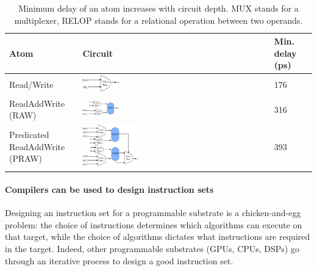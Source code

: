 \begin{table}[!t]
  \begin{scriptsize}
    \begin{tabular}{|p{}|p{}|p{}|}
  \hline
  Atom & Circuit & Min. delay (ps) \\
  \hline
  Read/Write & \includegraphics[width=0.2\textwidth]{rw.pdf} & 176 \\
  \hline
  ReadAddWrite (RAW) & \includegraphics[width=0.2\textwidth]{raw.pdf} & 316\\
  \hline
  \pbox{0.1\textwidth}
  {Predicated\\
  ReadAddWrite (PRAW)} & \includegraphics[width=0.3\textwidth]{pred_raw.pdf}  & 393 \\
  \hline
  \end{tabular}
\end{scriptsize}
\caption{Minimum delay of an atom increases with circuit depth. MUX
stands for a multiplexer, RELOP stands for a relational operation between two
operands.}
\label{tab:circuits}
\end{table}


\paragraph{Compilers can be used to design instruction sets}
Designing an instruction set for a programmable substrate is a chicken-and-egg
problem: the choice of instructions determines which algorithms can execute on
that target, while the choice of algorithms dictates what instructions are
required in the target. Indeed, other programmable substrates (GPUs, CPUs,
DSPs) go through an iterative process to design a good instruction set.

